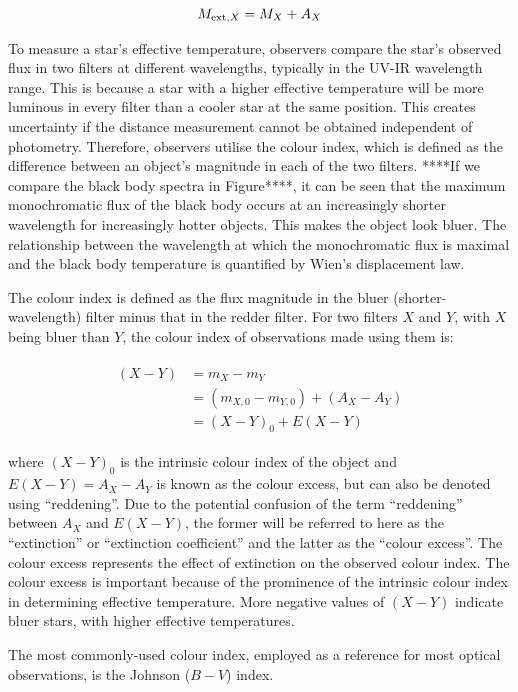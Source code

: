 \documentclass[12pt, a4paper]{report}
\begin{document}
\begin{equation}
M_{\textnormal{ext},X} = M_{X} + A_{X}
\end{equation}

To measure a star's effective temperature, observers compare the star's observed flux in two filters at different wavelengths, typically in the UV-IR wavelength range. This is because a star with a higher effective temperature will be more luminous in every filter than a cooler star at the same position. This creates uncertainty if the distance measurement cannot be obtained independent of photometry. Therefore, observers utilise the colour index, which is defined as the difference between an object's magnitude in each of the two filters. ****If we compare the black body spectra in Figure****, it can be seen that the maximum monochromatic flux of the black body occurs at an increasingly shorter wavelength for increasingly hotter objects. This makes the object look bluer. The relationship between the wavelength at which the monochromatic flux is maximal and the black body temperature is quantified by Wien's displacement law.

The colour index is defined as the flux magnitude in the bluer (shorter-wavelength) filter minus that in the redder filter. For two filters $X$ and $Y$, with $X$ being bluer than $Y$, the colour index of observations made using them is:

\begin{align}
\begin{split}
(X-Y) &= m_{X} - m_{Y} \\
&= (m_{X,0} - m_{Y,0}) + (A_{X} - A_{Y}) \\
&= (X-Y)_{0} + E(X-Y)
\end{split}
\end{align}

where $(X-Y)_{0}$ is the intrinsic colour index of the object and $E(X-Y) = A_{X} - A_{Y}$ is known as the colour excess, but can also be denoted using ``reddening''. Due to the potential confusion of the term ``reddening'' between $A_{X}$ and $E(X-Y)$, the former will be referred to here as the ``extinction'' or ``extinction coefficient'' and the latter as the ``colour excess''. The colour excess represents the effect of extinction on the observed colour index. The colour excess is important because of the prominence of the intrinsic colour index in determining effective temperature. More negative values of $(X-Y)$ indicate bluer stars, with higher effective temperatures.

The most commonly-used colour index, employed as a reference for most optical observations, is the Johnson ($B-V$) index.
\end{document}
